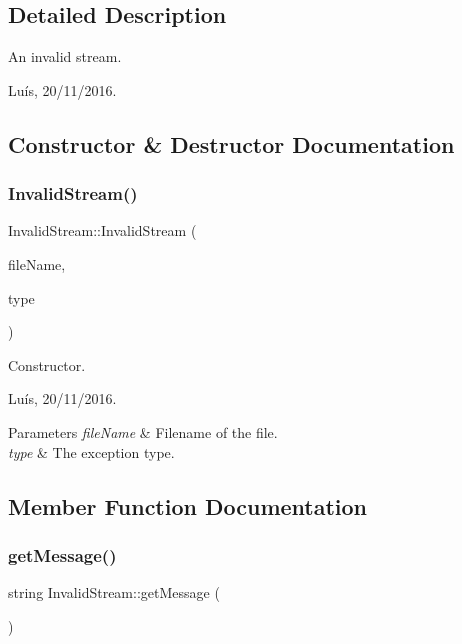 \subsection{Detailed Description}
An invalid stream. 

Luís, 20/11/2016. 

\subsection{Constructor \& Destructor Documentation}
\hypertarget{class_invalid_stream_ab1b3ef87fa02f66bd2709efd48ad3928}{}\label{class_invalid_stream_ab1b3ef87fa02f66bd2709efd48ad3928} 
\subsubsection{\texorpdfstring{Invalid\+Stream()}{InvalidStream()}}
{\footnotesize\ttfamily Invalid\+Stream\+::\+Invalid\+Stream (\begin{DoxyParamCaption}\item[{string}]{file\+Name,  }\item[{\hyperlink{_exceptions_8hpp_a20debbce0a9d256d07eac93067032a39}{Invalid\+Stream\+Type}}]{type }\end{DoxyParamCaption})}



Constructor. 

Luís, 20/11/2016. 


\begin{DoxyParams}{Parameters}
{\em file\+Name} & Filename of the file. \\
\hline
{\em type} & The exception type. \\
\hline
\end{DoxyParams}


\subsection{Member Function Documentation}
\hypertarget{class_invalid_stream_a8aa15b0bc9caa1a31b15cfcbebaad67b}{}\label{class_invalid_stream_a8aa15b0bc9caa1a31b15cfcbebaad67b} 
\subsubsection{\texorpdfstring{get\+Message()}{getMessage()}}
{\footnotesize\ttfamily string Invalid\+Stream\+::get\+Message (\begin{DoxyParamCaption}{ }\end{DoxyParamCaption})}



